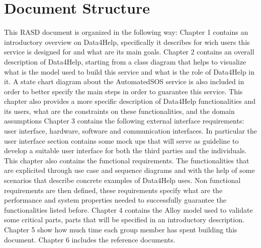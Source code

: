 \section{Document Structure}
This RASD document is organized in the following way:
Chapter 1 contains an introductory overview on Data4Help, specifically it describes for wich users this service is designed for and what are its main goals.
\givespace
Chapter 2 contains an overall description of Data4Help, starting from a class diagram that helps to visualize what is the model used to build this service and what is the role of Data4Help in it. A state chart diagram about the AutomatedSOS service is also included in order to better specify the main steps in order to guarantee this service. This chapter also provides a more specific description of Data4Help functionalities and its users, what are the constraints on these functionalities, and the domain assumptions
\givespace
Chapter 3 contains the following external interface requirements: user interface, hardware, software and communication interfaces. In particular the user interface section contains some mock ups that will serve as guideline to develop a suitable user interface for both the third parties and the individuals. 
This chapter also contains the functional requirements. The functionalities that are explicited through use case and sequence diagrams and with the help of some scenarios that describe concrete examples of Data4Help uses.
Non functional requirements are then defined, these requirements specify what are the performance and system properties needed to successfully guarantee the functionalities listed before.
\givespace
Chapter 4 contains the Alloy model used to validate some critical parts, parts that will be specified in an introductory description.
\givespace
Chapter 5 show how much time each group member has spent building this document.
\givespace
Chapter 6 includes the reference documents.